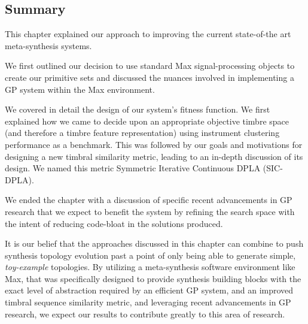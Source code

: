 \documentclass[a4paper,12pt]{report} 	%
\numberwithin{figure}{chapter}
\numberwithin{table}{chapter}
\numberwithin{equation}{chapter}
\begin{document}
\begin{flushleft}
\subsection{Summary}
This chapter explained our approach to improving the current state-of-the art meta-synthesis systems. 

We first outlined our decision to use standard Max signal-processing objects to create our primitive sets and discussed the nuances involved in implementing a GP system within the Max environment.

We covered in detail the design of our system's fitness function. We first explained how we came to decide upon an appropriate objective timbre space (and therefore a timbre feature representation) using instrument clustering performance as a benchmark. This was followed by our goals and motivations for designing a new timbral similarity metric, leading to an in-depth discussion of its design. We named this metric Symmetric Iterative Continuous DPLA (SIC-DPLA).

We ended the chapter with a discussion of specific recent advancements in GP research that we expect to benefit the system by refining the search space with the intent of reducing code-bloat in the solutions produced.

It is our belief that the approaches discussed in this chapter can combine to push synthesis topology evolution past a point of only being able to generate simple, \emph{toy-example} topologies. By utilizing a meta-synthesis software environment like Max, that was specifically designed to provide synthesis building blocks with the exact level of abstraction required by an efficient GP system, and an improved timbral sequence similarity metric, and leveraging recent advancements in GP research, we expect our results to contribute greatly to this area of research.
\clearpage

\vspace*{\QuarterPage}

\end{flushleft}
\end{document}
